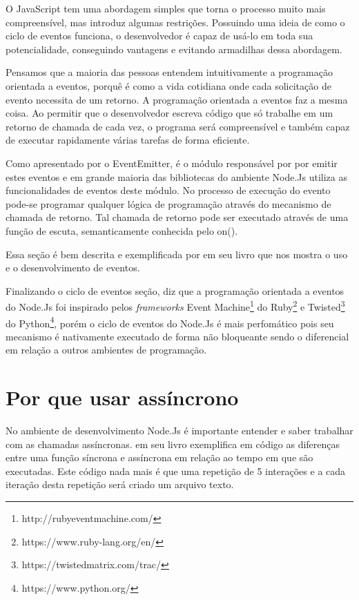   
  O JavaScript tem uma abordagem simples que torna o processo muito mais compreensível, mas introduz algumas restrições. 
  Possuindo uma ideia de como o ciclo de eventos funciona, o desenvolvedor é capaz de usá-lo em toda sua potencialidade, 
  conseguindo vantagens e evitando armadilhas dessa abordagem.\cite{Hughes:2012}
  
  Pensamos que a maioria das pessoas entendem intuitivamente a programação orientada a eventos, porquê é como a 
  vida cotidiana onde cada solicitação de evento necessita de um retorno. A programação orientada a eventos faz a 
  mesma coisa. Ao permitir que o desenvolvedor escreva código que só trabalhe em um retorno de chamada de cada vez, 
  o programa será compreensível e também capaz de executar rapidamente várias tarefas de forma eficiente.\cite{Hughes:2012}
  
  Como apresentado por \cite{Pereira:2013} o EventEmitter, é o módulo responsável por por emitir estes eventos e em 
  grande maioria das bibliotecas do ambiente Node.Js utiliza as funcionalidades de eventos deste módulo. 
  No processo de execução do evento pode-se programar qualquer lógica de programação através do 
  mecanismo de chamada de retorno. Tal chamada de retorno pode ser executado através de uma função de escuta, 
  semanticamente conhecida pelo on().
  
  Essa seção é bem descrita e exemplificada por \cite{Wilson:2013} em seu livro que nos mostra o uso e o 
  desenvolvimento de eventos.

  
  Finalizando o ciclo de eventos seção, \cite{Pereira:2013} diz que a programação orientada a eventos do Node.Js 
  foi inspirado pelos \textit{frameworks} Event Machine\footnote{http://rubyeventmachine.com/} do 
  Ruby\footnote{https://www.ruby-lang.org/en/} e Twisted\footnote{https://twistedmatrix.com/trac/} do 
  Python\footnote{https://www.python.org/}, porém o ciclo de eventos do Node.Js é mais perfomático pois seu mecanismo 
  é nativamente executado de forma não bloqueante sendo o diferencial em relação a outros ambientes de programação.
  
\section{Por que usar assíncrono}
\label{porque-usar-assincrono}

  No ambiente de desenvolvimento Node.Js é importante entender e saber trabalhar com as chamadas assíncronas. 
  \cite{Pereira:2013} em seu livro exemplifica em código as diferenças entre uma função síncrona e assíncrona 
  em relação ao tempo em que são executadas. Este código nada mais é que uma repetição de 5 interações e a cada 
  iteração desta repetição será criado um arquivo texto.
  
